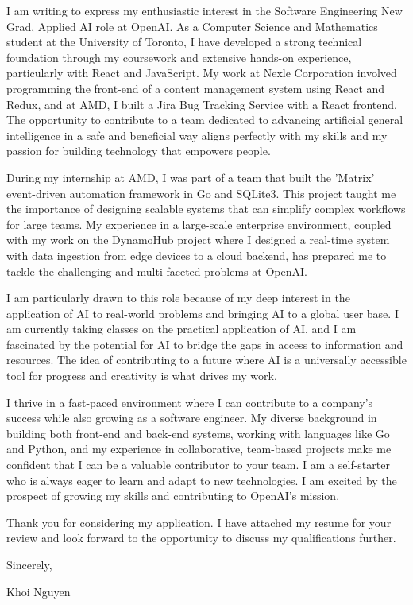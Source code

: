 \documentclass[
	12pt, %
]{resume} %
\begin{document}
    I am writing to express my enthusiastic interest in the Software Engineering New Grad, Applied AI role at OpenAI. As a Computer Science and Mathematics student at the University of Toronto, I have developed a strong technical foundation through my coursework and extensive hands-on experience, particularly with React and JavaScript. My work at Nexle Corporation involved programming the front-end of a content management system using React and Redux, and at AMD, I built a Jira Bug Tracking Service with a React frontend. The opportunity to contribute to a team dedicated to advancing artificial general intelligence in a safe and beneficial way aligns perfectly with my skills and my passion for building technology that empowers people.

During my internship at AMD, I was part of a team that built the 'Matrix' event-driven automation framework in Go and SQLite3. This project taught me the importance of designing scalable systems that can simplify complex workflows for large teams. My experience in a large-scale enterprise environment, coupled with my work on the DynamoHub project where I designed a real-time system with data ingestion from edge devices to a cloud backend, has prepared me to tackle the challenging and multi-faceted problems at OpenAI.

I am particularly drawn to this role because of my deep interest in the application of AI to real-world problems and bringing AI to a global user base. I am currently taking classes on the practical application of AI, and I am fascinated by the potential for AI to bridge the gaps in access to information and resources. The idea of contributing to a future where AI is a universally accessible tool for progress and creativity is what drives my work.

I thrive in a fast-paced environment where I can contribute to a company's success while also growing as a software engineer. My diverse background in building both front-end and back-end systems, working with languages like Go and Python, and my experience in collaborative, team-based projects make me confident that I can be a valuable contributor to your team. I am a self-starter who is always eager to learn and adapt to new technologies. I am excited by the prospect of growing my skills and contributing to OpenAI's mission.

Thank you for considering my application. I have attached my resume for your review and look forward to the opportunity to discuss my qualifications further.

Sincerely,

Khoi Nguyen
\end{document}
